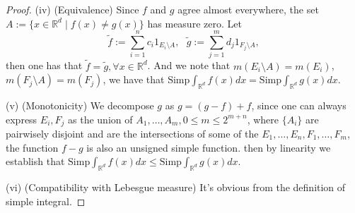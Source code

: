 \documentclass[a4paper]{article}
\begin{document}
\begin{proof}
(iv) (Equivalence) Since $f$ and $g$ agree almost everywhere, the set $A := \{x \in \mathbb{R}^d \mid f(x) \ne g(x)\}$
has measure zero. Let $$
\tilde{f} := \sum_{i = 1}^n c_i1_{E_i \setminus A},\ \ \ \tilde{g}:= \sum_{j = 1}^m  d_j1_{F_j \setminus A},
$$then one has that $\tilde{f} = \tilde{g}, \forall x \in \mathbb{R}^d$. And we note that $m(E_i \setminus A) = m(E_i)$,
$m(F_j \setminus A) = m(F_j)$, we have that $\mathrm{Simp}\int_{\mathbb{R}^d} f(x) dx = \mathrm{Simp}\int_{\mathbb{R}^d} g(x) dx$.

(v) (Monotonicity) We decompose $g$ as $g = (g - f) + f$, since one can always express $E_i, F_j$ as the union of 
$A_1, \dots, A_m, 0 \leq m \leq 2^{m + n}$, where $\{A_i\}$ are pairwisely disjoint and are the intersections of some 
of the $E_1, \dots, E_n, F_1, \dots, F_m$, the function $f - g$ is also an unsigned simple function. 
then by linearity we establish that $\mathrm{Simp}\int_{\mathbb{R}^d} f(x)dx \leq \mathrm{Simp}\int_{\mathbb{R}^d} g(x) dx$.

(vi) (Compatibility with Lebesgue measure) It's obvious from the definition of simple integral.
\end{proof}
\end{document}

